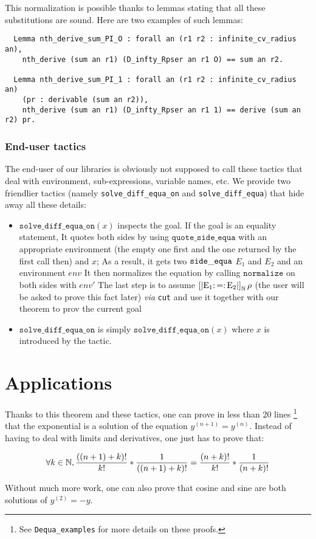 \documentclass{article}
\begin{document}
This normalization is possible thanks to lemmas stating that all these
substitutions are sound. Here are two examples of such lemmas:

\begin{verbatim}
  Lemma nth_derive_sum_PI_O : forall an (r1 r2 : infinite_cv_radius an),
    nth_derive (sum an r1) (D_infty_Rpser an r1 O) == sum an r2.

  Lemma nth_derive_sum_PI_1 : forall an (r1 r2 : infinite_cv_radius an)
    (pr : derivable (sum an r2)),
    nth_derive (sum an r1) (D_infty_Rpser an r1 1) == derive (sum an r2) pr.
\end{verbatim}

\subsubsection{End-user tactics}

The end-user of our libraries is obviously not supposed to call these tactics
that deal with environment, sub-expressions, variable names, etc. We provide two
friendlier tactics (namely \texttt{solve\_diff\_equa\_on} and
\texttt{solve\_diff\_equa}) that hide away all these details:

\begin{itemize}
\item $\mathtt{solve\_diff\_equa\_on}(x)$ inspects the goal. If the goal is an
equality statement,
  \subitem It quotes both sides by using $\mathtt{quote\_side\_equa}$ with an
  appropriate environment (the empty one first and the one returned by the first
  call then) and $x$; As a result, it gets two $\operatorname{\mathtt{side\_equa}}$ $E_1$ and $E_2$ and an
  environment $env$
  \subitem It then normalizes the equation by calling $\mathtt{normalize}$ on
  both sides with $env'$
  \subitem The last step is to assume $\operatorname{\operatorname{\left[\left| E_1 :=: E_2 \right|\right]}_{\mathbb{N}} \rho}$ (the user will be asked to prove
  this fact later) \textit{via} \texttt{cut} and use it together with our
  theorem to prov the current goal
\item $\mathtt{solve\_diff\_equa\_on}$  is simply
  $\mathtt{solve\_diff\_equa\_on}(x)$  where $x$ is introduced by the tactic.
\end{itemize}

\section{Applications}

Thanks to this theorem and these tactics, one can prove in less than 20 lines
\footnote{See \texttt{Dequa\_examples} for more details on these proofs.} that
the exponential is a solution of the equation $y^{(n+1)} = y^{(n)}$. Instead of
having to deal with limits and derivatives, one just has to prove that:

$$\forall k \in \mathbb{N}, \frac{((n+1) + k)!}{k!} * \frac{1}{((n+1)+k)!}
= \frac{(n+k)!}{k!} * \frac{1}{(n+k)!}$$

Without much more work, one can also prove that cosine and sine are
both solutions of $y^{(2)} = - y$.

\printbibliography{}


\end{document}
